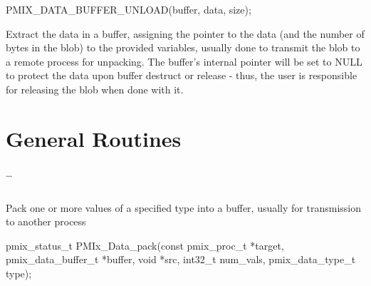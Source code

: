 \format

\cspecificstart
\begin{codepar}
PMIX_DATA_BUFFER_UNLOAD(buffer, data, size);
\end{codepar}
\cspecificend

\begin{arglist}
\end{arglist}

\descr

Extract the data in a buffer, assigning the pointer to the data (and the number of bytes in the blob) to the provided variables, usually done to transmit the blob to a remote process for unpacking. The buffer's internal pointer will be set to NULL to protect the data upon buffer destruct or release - thus, the user is responsible for releasing the blob when done with it.


\section{General Routines}
\label{chap:api_init:general}

\ldots

\subsection{}

\summary

Pack one or more values of a specified type into a buffer, usually for transmission to another process

\format

\cspecificstart
\begin{codepar}
pmix_status_t
PMIx_Data_pack(const pmix_proc_t *target,
               pmix_data_buffer_t *buffer,
               void *src, int32_t num_vals,
               pmix_data_type_t type);
\end{codepar}
\cspecificend

